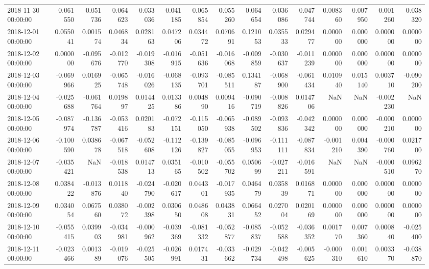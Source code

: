 \begin{tabular}{lrrrrrrrrrrrrrr}
2018-11-30 00:00:00 & -0.061550 & -0.051736 & -0.064623 & -0.033036 & -0.041185 & -0.065854 & -0.055260 & -0.064654 & -0.036086 & -0.047744 & 0.008360 & 0.007950 & -0.001260 & -0.038320 \\
2018-12-01 00:00:00 & 0.055041 & 0.001574 & 0.046834 & 0.028163 & 0.047206 & 0.034472 & 0.070691 & 0.121053 & 0.035533 & 0.029477 & 0.000000 & 0.000000 & 0.000000 & 0.000000 \\
2018-12-02 00:00:00 & 0.000000 & -0.095676 & -0.012770 & -0.019308 & -0.016915 & -0.051636 & -0.016068 & -0.009859 & -0.030637 & -0.011239 & 0.000000 & 0.000000 & 0.000000 & 0.000000 \\
2018-12-03 00:00:00 & -0.069966 & 0.016925 & -0.065748 & -0.016026 & -0.068135 & -0.093701 & -0.085511 & 0.134187 & -0.068900 & -0.061434 & 0.010940 & 0.015140 & 0.003710 & -0.090200 \\
2018-12-04 00:00:00 & -0.025688 & -0.061764 & 0.019897 & 0.014425 & 0.013386 & 0.004890 & 0.009416 & -0.090719 & -0.008826 & 0.014706 & NaN & NaN & -0.002230 & NaN \\
2018-12-05 00:00:00 & -0.087974 & -0.136787 & -0.053416 & 0.020183 & -0.072151 & -0.115050 & -0.065938 & -0.089502 & -0.093836 & -0.042342 & 0.000000 & 0.000000 & -0.000210 & 0.000000 \\
2018-12-06 00:00:00 & -0.100590 & 0.038678 & -0.067518 & -0.052608 & -0.112126 & -0.139827 & -0.085055 & -0.096953 & -0.111111 & -0.087834 & -0.001210 & 0.004390 & -0.000760 & 0.021700 \\
2018-12-07 00:00:00 & -0.035421 & NaN & -0.018538 & 0.014713 & 0.035165 & -0.010502 & -0.055702 & 0.050699 & -0.027211 & -0.016591 & NaN & NaN & -0.000510 & 0.096270 \\
2018-12-08 00:00:00 & 0.038422 & -0.013876 & 0.011840 & -0.024790 & -0.020617 & 0.044301 & -0.017935 & 0.046479 & 0.035839 & 0.016871 & 0.000000 & 0.000000 & 0.000000 & 0.000000 \\
2018-12-09 00:00:00 & 0.034054 & 0.067560 & 0.038072 & -0.002398 & 0.030650 & 0.048608 & 0.043831 & 0.066452 & 0.027004 & 0.020169 & 0.000000 & 0.000000 & 0.000000 & 0.000000 \\
2018-12-10 00:00:00 & -0.055415 & 0.039903 & -0.034981 & -0.000962 & -0.039369 & -0.081332 & -0.052877 & -0.085837 & -0.052588 & -0.036352 & 0.001770 & 0.007360 & 0.000840 & -0.025400 \\
2018-12-11 00:00:00 & -0.023466 & 0.001389 & -0.019076 & -0.025505 & -0.026991 & 0.017431 & -0.033662 & -0.029734 & -0.042498 & -0.005625 & -0.000310 & 0.001610 & 0.003370 & -0.038870 \\

\end{tabular}
